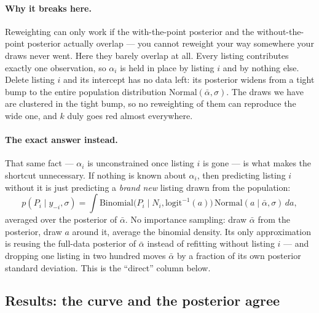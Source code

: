 \documentclass[11pt,a4paper]{article}
\begin{document}
\paragraph{Why it breaks here.} Reweighting can only work if the with-the-point
posterior and the without-the-point posterior actually overlap --- you cannot
reweight your way somewhere your draws never went. Here they barely overlap at
all. Every listing contributes exactly one observation, so $\alpha_i$ is held in
place by listing $i$ and by nothing else. Delete listing $i$ and its intercept
has no data left: its posterior widens from a tight bump to the entire
population distribution $\text{Normal}(\bar\alpha,\sigma)$. The draws we have
are clustered in the tight bump, so no reweighting of them can reproduce the
wide one, and $k$ duly goes red almost everywhere.

\paragraph{The exact answer instead.} That same fact --- $\alpha_i$ is
unconstrained once listing $i$ is gone --- is what makes the shortcut
unnecessary. If nothing is known about $\alpha_i$, then predicting listing $i$
without it is just predicting a \emph{brand new} listing drawn from the
population:
\[
  p(P_i \mid y_{-i}, \sigma)
  = \int \text{Binomial}\big(P_i \mid N_i, \text{logit}^{-1}(a)\big)\,
         \text{Normal}(a \mid \bar\alpha, \sigma)\, da ,
\]
averaged over the posterior of $\bar\alpha$. No importance sampling: draw
$\bar\alpha$ from the posterior, draw $a$ around it, average the binomial
density. Its only approximation is reusing the full-data posterior of
$\bar\alpha$ instead of refitting without listing $i$ --- and dropping one
listing in two hundred moves $\bar\alpha$ by a fraction of its own posterior
standard deviation. This is the ``direct'' column below.

\subsection{Results: the curve and the posterior agree}
\end{document}
